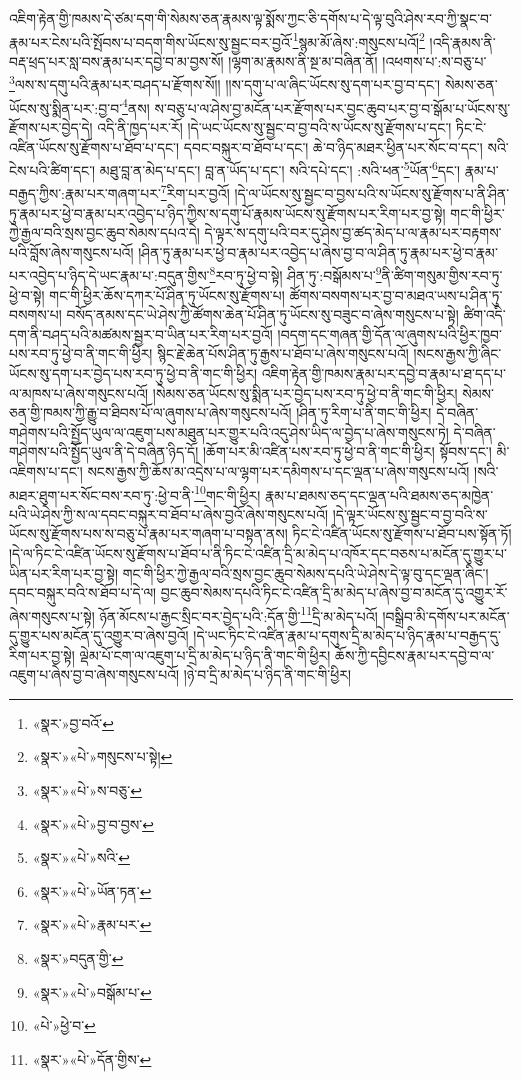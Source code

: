 འཇིག་རྟེན་གྱི་ཁམས་དེ་ཙམ་དག་གི་སེམས་ཅན་རྣམས་ལྟ་སྨོས་ཀྱང་ཅི་དགོས་པ་དེ་ལྟ་བུའི་ཤེས་རབ་ཀྱི་སྣང་བ་རྣམ་པར་ངེས་པའི་སྤོབས་པ་བདག་གིས་ཡོངས་སུ་སྦྱང་བར་བྱའོ་\footnote{«སྣར་»བྱ་བའོ་}སྙམ་མོ་ཞེས་:གསུངས་པའོ།\footnote{«སྣར་»«པེ་»གསུངས་པ་སྟེ།} །འདི་རྣམས་ནི་བརྡ་ཕྲད་པར་སླ་བས་རྣམ་པར་དབྱེ་བ་མ་བྱས་སོ། །ལྷག་མ་རྣམས་ནི་སྔ་མ་བཞིན་ནོ། །འཕགས་པ་:ས་བཅུ་པ་\footnote{«སྣར་»«པེ་»ས་བཅུ་}ལས་ས་དགུ་པའི་རྣམ་པར་བཤད་པ་རྫོགས་སོ།། །།ས་དགུ་པ་ལ་ཞིང་ཡོངས་སུ་དག་པར་བྱ་བ་དང་། སེམས་ཅན་ཡོངས་སུ་སྨིན་པར་:བྱ་བ་\footnote{«སྣར་»«པེ་»བྱ་བ་བྱས་}ནས། ས་བཅུ་པ་ལ་ཤེས་བྱ་མངོན་པར་རྫོགས་པར་བྱང་ཆུབ་པར་བྱ་བ་སྒོམ་པ་ཡོངས་སུ་རྫོགས་པར་བྱེད་དེ། འདི་ནི་ཁྱད་པར་རོ། །དེ་ཡང་ཡོངས་སུ་སྦྱང་བ་བྱ་བའི་ས་ཡོངས་སུ་རྫོགས་པ་དང་། ཏིང་ངེ་འཛིན་ཡོངས་སུ་རྫོགས་པ་ཐོབ་པ་དང་། དབང་བསྐུར་བ་ཐོབ་པ་དང་། ཆེ་བ་ཉིད་མཐར་ཕྱིན་པར་སོང་བ་དང་། སའི་ངེས་པའི་ཚིག་དང་། མཐུ་བླ་ན་མེད་པ་དང་། བླ་ན་ཡོད་པ་དང་། སའི་དཔེ་དང་། :སའི་ཕན་\footnote{«སྣར་»«པེ་»སའི་}ཡོན་\footnote{«སྣར་»«པེ་»ཡོན་ཏན་}དང་། རྣམ་པ་བརྒྱད་ཀྱིས་:རྣམ་པར་གཞག་པར་\footnote{«སྣར་»«པེ་»རྣམ་པར་}རིག་པར་བྱའོ། །དེ་ལ་ཡོངས་སུ་སྦྱང་བ་བྱས་པའི་ས་ཡོངས་སུ་རྫོགས་པ་ནི་ཤིན་ཏུ་རྣམ་པར་ཕྱེ་བ་རྣམ་པར་འབྱེད་པ་ཉིད་ཀྱིས་ས་དགུ་པོ་རྣམས་ཡོངས་སུ་རྫོགས་པར་རིག་པར་བྱ་སྟེ། གང་གི་ཕྱིར་ཀྱེ་རྒྱལ་བའི་སྲས་བྱང་ཆུབ་སེམས་དཔའ་དེ། དེ་ལྟར་ས་དགུ་པའི་བར་དུ་ཤེས་བྱ་ཚད་མེད་པ་ལ་རྣམ་པར་བརྟགས་པའི་བློས་ཞེས་གསུངས་པའོ། །ཤིན་ཏུ་རྣམ་པར་ཕྱེ་བ་རྣམ་པར་འབྱེད་པ་ཞེས་བྱ་བ་ལ་ཤིན་ཏུ་རྣམ་པར་ཕྱེ་བ་རྣམ་པར་འབྱེད་པ་ཉིད་དེ་ཡང་རྣམ་པ་:བདུན་གྱིས་\footnote{«སྣར་»བདུན་གྱི་}རབ་ཏུ་ཕྱེ་བ་སྟེ། ཤིན་ཏུ་:བསྒོམས་པ་\footnote{«སྣར་»«པེ་»བསྒོམ་པ་}ནི་ཚིག་གསུམ་གྱིས་རབ་ཏུ་ཕྱེ་བ་སྟེ། གང་གི་ཕྱིར་ཆོས་དཀར་པོ་ཤིན་ཏུ་ཡོངས་སུ་རྫོགས་པ། ཚོགས་བསགས་པར་བྱ་བ་མཐའ་ཡས་པ་ཤིན་ཏུ་བསགས་པ། བསོད་ནམས་དང་ཡེ་ཤེས་ཀྱི་ཚོགས་ཆེན་པོ་ཤིན་ཏུ་ཡོངས་སུ་བཟུང་བ་ཞེས་གསུངས་པ་སྟེ། ཚིག་འདི་དག་ནི་བཤད་པའི་མཚམས་སྦྱར་བ་ཡིན་པར་རིག་པར་བྱའོ། །བདག་དང་གཞན་གྱི་དོན་ལ་ཞུགས་པའི་ཕྱིར་ཁྱབ་པས་རབ་ཏུ་ཕྱེ་བ་ནི་གང་གི་ཕྱིར། སྙིང་རྗེ་ཆེན་པོས་ཤིན་ཏུ་རྒྱས་པ་ཐོབ་པ་ཞེས་གསུངས་པའོ། །སངས་རྒྱས་ཀྱི་ཞིང་ཡོངས་སུ་དག་པར་བྱེད་པས་རབ་ཏུ་ཕྱེ་བ་ནི་གང་གི་ཕྱིར། འཇིག་རྟེན་གྱི་ཁམས་རྣམ་པར་དབྱེ་བ་རྣམ་པ་ཐ་དད་པ་ལ་མཁས་པ་ཞེས་གསུངས་པའོ། །སེམས་ཅན་ཡོངས་སུ་སྨིན་པར་བྱེད་པས་རབ་ཏུ་ཕྱེ་བ་ནི་གང་གི་ཕྱིར། སེམས་ཅན་གྱི་ཁམས་ཀྱི་རྒྱུ་བ་ཐིབས་པོ་ལ་ཞུགས་པ་ཞེས་གསུངས་པའོ། །ཤིན་ཏུ་རིག་པ་ནི་གང་གི་ཕྱིར། དེ་བཞིན་གཤེགས་པའི་སྤྱོད་ཡུལ་ལ་འཇུག་པས་མཐུན་པར་གྱུར་པའི་འདུ་ཤེས་ཡིད་ལ་བྱེད་པ་ཞེས་གསུངས་ཏེ། དེ་བཞིན་གཤེགས་པའི་སྤྱོད་ཡུལ་ནི་དེ་བཞིན་ཉིད་དོ། །ཆོག་པར་མི་འཛིན་པས་རབ་ཏུ་ཕྱེ་བ་ནི་གང་གི་ཕྱིར། སྟོབས་དང་། མི་འཇིགས་པ་དང་། སངས་རྒྱས་ཀྱི་ཆོས་མ་འདྲེས་པ་ལ་ལྷག་པར་དམིགས་པ་དང་ལྡན་པ་ཞེས་གསུངས་པའོ། །སའི་མཐར་ཐུག་པར་སོང་བས་རབ་ཏུ་:ཕྱེ་བ་ནི་\footnote{«པེ་»ཕྱེ་བ་}གང་གི་ཕྱིར། རྣམ་པ་ཐམས་ཅད་དང་ལྡན་པའི་ཐམས་ཅད་མཁྱེན་པའི་ཡེ་ཤེས་ཀྱི་ས་ལ་དབང་བསྐུར་བ་ཐོབ་པ་ཞེས་བྱའོ་ཞེས་གསུངས་པའོ། །དེ་ལྟར་ཡོངས་སུ་སྦྱང་བ་བྱ་བའི་ས་ཡོངས་སུ་རྫོགས་པས་ས་བཅུ་པ་རྣམ་པར་གཞག་པ་བསྟན་ནས། ཏིང་ངེ་འཛིན་ཡོངས་སུ་རྫོགས་པ་ཐོབ་པས་སྟོན་ཏོ། །དེ་ལ་ཏིང་ངེ་འཛིན་ཡོངས་སུ་རྫོགས་པ་ཐོབ་པ་ནི་ཏིང་ངེ་འཛིན་དྲི་མ་མེད་པ་འཁོར་དང་བཅས་པ་མངོན་དུ་གྱུར་པ་ཡིན་པར་རིག་པར་བྱ་སྟེ། གང་གི་ཕྱིར་ཀྱེ་རྒྱལ་བའི་སྲས་བྱང་ཆུབ་སེམས་དཔའི་ཡེ་ཤེས་དེ་ལྟ་བུ་དང་ལྡན་ཞིང་། དབང་བསྐུར་བའི་ས་ཐོབ་པ་དེ་ལ། བྱང་ཆུབ་སེམས་དཔའི་ཏིང་ངེ་འཛིན་དྲི་མ་མེད་པ་ཞེས་བྱ་བ་མངོན་དུ་འགྱུར་རོ་ཞེས་གསུངས་པ་སྟེ། ཉོན་མོངས་པ་རྒྱང་སྲིང་བར་བྱེད་པའི་:དོན་གྱི་\footnote{«སྣར་»«པེ་»དོན་གྱིས་}དྲི་མ་མེད་པའོ། །བསྒྲིབ་མི་དགོས་པར་མངོན་དུ་གྱུར་པས་མངོན་དུ་འགྱུར་བ་ཞེས་བྱའོ། །དེ་ཡང་ཏིང་ངེ་འཛིན་རྣམ་པ་དགུས་དྲི་མ་མེད་པ་ཉིད་རྣམ་པ་བརྒྱད་དུ་རིག་པར་བྱ་སྟེ། ལྡེམ་པོ་ངག་ལ་འཇུག་པ་དྲི་མ་མེད་པ་ཉིད་ནི་གང་གི་ཕྱིར། ཆོས་ཀྱི་དབྱིངས་རྣམ་པར་དབྱེ་བ་ལ་འཇུག་པ་ཞེས་བྱ་བ་ཞེས་གསུངས་པའོ། །ཉེ་བ་དྲི་མ་མེད་པ་ཉིད་ནི་གང་གི་ཕྱིར། 